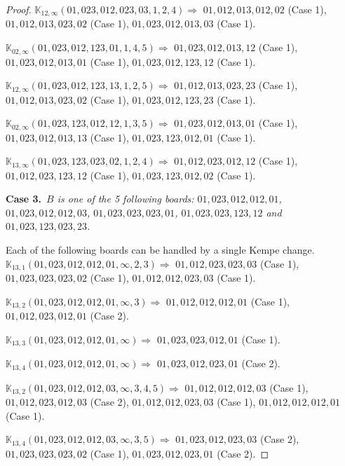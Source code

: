 \documentclass[12pt]{article}
\newcommand{\K}{\mathbb{K}}
\newcommand{\case}[2]{{\bf Case #1.}~{\it #2}~~}
\begin{document}
\begin{proof}
$\K_{12,\infty}(01,023,012,023,03,1, 2, 4)\Rightarrow $ $01,012,013,012,02$ (Case 1), $01,012,013,023,02$ (Case 1), $01,023,012,013,03$ (Case 1).

\bigskip

$\K_{02,\infty}(01,023,012,123,01,1, 4, 5)\Rightarrow $ $01,023,012,013,12$ (Case 1), $01,023,012,013,01$ (Case 1), $01,023,012,123,12$ (Case 1).

\bigskip

$\K_{12,\infty}(01,023,012,123,13,1, 2, 5)\Rightarrow $ $01,012,013,023,23$ (Case 1), $01,012,013,023,02$ (Case 1), $01,023,012,123,23$ (Case 1).

\bigskip

$\K_{02,\infty}(01,023,123,012,12,1, 3, 5)\Rightarrow $ $01,023,012,013,01$ (Case 1), $01,023,012,013,13$ (Case 1), $01,023,123,012,01$ (Case 1).

\bigskip

$\K_{13,\infty}(01,023,123,023,02,1, 2, 4)\Rightarrow $ $01,012,023,012,12$ (Case 1), $01,012,023,123,12$ (Case 1), $01,023,123,012,02$ (Case 1).

\bigskip


\bigskip
\case{3}{$B$ is one of the 5 following boards:
 $01,023,012,012,01$, $01,023,012,012,03$, $01,023,023,023,01$, $01,023,023,123,12$ and $01,023,123,023,23$.}

\bigskip

\bigskip

Each of the following boards can be handled by a single Kempe change.
$\K_{13,1}(01,023,012,012,01,\infty,2, 3)\Rightarrow $ $01,012,023,023,03$ (Case 1), $01,023,023,023,02$ (Case 1), $01,012,012,023,03$ (Case 1).

$\K_{13,2}(01,023,012,012,01,\infty,3)\Rightarrow $ $01,012,012,012,01$ (Case 1), $01,012,023,012,01$ (Case 2).

$\K_{13,3}(01,023,012,012,01,\infty)\Rightarrow $ $01,023,023,012,01$ (Case 1).

$\K_{13,4}(01,023,012,012,01,\infty)\Rightarrow $ $01,023,012,023,01$ (Case 2).


\bigskip

$\K_{13,2}(01,023,012,012,03,\infty,3, 4, 5)\Rightarrow $ $01,012,012,012,03$ (Case 1), $01,012,023,012,03$ (Case 2), $01,012,012,023,03$ (Case 1), $01,012,012,012,01$ (Case 1).

$\K_{13,4}(01,023,012,012,03,\infty,3, 5)\Rightarrow $ $01,023,012,023,03$ (Case 2), $01,023,023,023,02$ (Case 1), $01,023,012,023,01$ (Case 2).


\end{proof}
\end{document}

